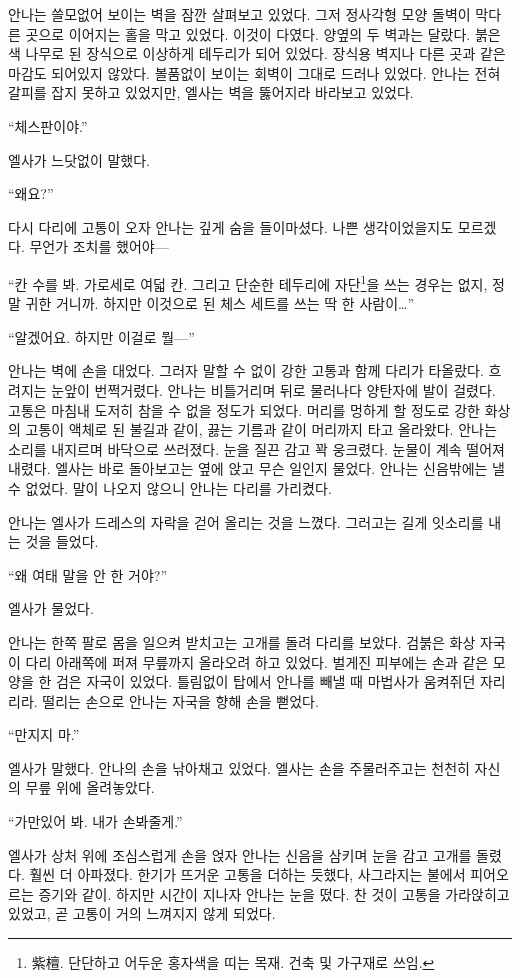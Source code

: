 안나는 쓸모없어 보이는 벽을 잠깐 살펴보고 있었다. 그저 정사각형 모양 돌벽이 막다른 곳으로 이어지는 홀을 막고 있었다. 이것이 다였다. 양옆의 두 벽과는 달랐다. 붉은색 나무로 된 장식으로 이상하게 테두리가 되어 있었다. 장식용 벽지나 다른 곳과 같은 마감도 되어있지 않았다. 볼품없이 보이는 회벽이 그대로 드러나 있었다. 안나는 전혀 갈피를 잡지 못하고 있었지만, 엘사는 벽을 뚫어지라 바라보고 있었다.

``체스판이야.''

엘사가 느닷없이 말했다.

``왜요?''

다시 다리에 고통이 오자 안나는 깊게 숨을 들이마셨다. 나쁜 생각이었을지도 모르겠다. 무언가 조치를 했어야—

``칸 수를 봐. 가로세로 여덟 칸. 그리고 단순한 테두리에 자단\footnote{紫檀. 단단하고 어두운 홍자색을 띠는 목재. 건축 및 가구재로 쓰임.}을 쓰는 경우는 없지, 정말 귀한 거니까. 하지만 이것으로 된 체스 세트를 쓰는 딱 한 사람이\ldots''

``알겠어요. 하지만 이걸로 뭘—''

안나는 벽에 손을 대었다. 그러자 말할 수 없이 강한 고통과 함께 다리가 타올랐다. 흐려지는 눈앞이 번쩍거렸다. 안나는 비틀거리며 뒤로 물러나다 양탄자에 발이 걸렸다. 고통은 마침내 도저히 참을 수 없을 정도가 되었다. 머리를 멍하게 할 정도로 강한 화상의 고통이 액체로 된 불길과 같이, 끓는 기름과 같이 머리까지 타고 올라왔다. 안나는 소리를 내지르며 바닥으로 쓰러졌다. 눈을 질끈 감고 꽉 웅크렸다. 눈물이 계속 떨어져 내렸다. 엘사는 바로 돌아보고는 옆에 앉고 무슨 일인지 물었다. 안나는 신음밖에는 낼 수 없었다. 말이 나오지 않으니 안나는 다리를 가리켰다.

안나는 엘사가 드레스의 자락을 걷어 올리는 것을 느꼈다. 그러고는 길게 잇소리를 내는 것을 들었다.

``왜 여태 말을 안 한 거야?''

엘사가 물었다.

안나는 한쪽 팔로 몸을 일으켜 받치고는 고개를 돌려 다리를 보았다. 검붉은 화상 자국이 다리 아래쪽에 퍼져 무릎까지 올라오려 하고 있었다. 벌게진 피부에는 손과 같은 모양을 한 검은 자국이 있었다. 틀림없이 탑에서 안나를 빼낼 때 마법사가 움켜쥐던 자리리라. 떨리는 손으로 안나는 자국을 향해 손을 뻗었다.

``만지지 마.''

엘사가 말했다. 안나의 손을 낚아채고 있었다. 엘사는 손을 주물러주고는 천천히 자신의 무릎 위에 올려놓았다.

``가만있어 봐. 내가 손봐줄게.''

엘사가 상처 위에 조심스럽게 손을 얹자 안나는 신음을 삼키며 눈을 감고 고개를 돌렸다. 훨씬 더 아파졌다. 한기가 뜨거운 고통을 더하는 듯했다, 사그라지는 불에서 피어오르는 증기와 같이. 하지만 시간이 지나자 안나는 눈을 떴다. 찬 것이 고통을 가라앉히고 있었고, 곧 고통이 거의 느껴지지 않게 되었다.


